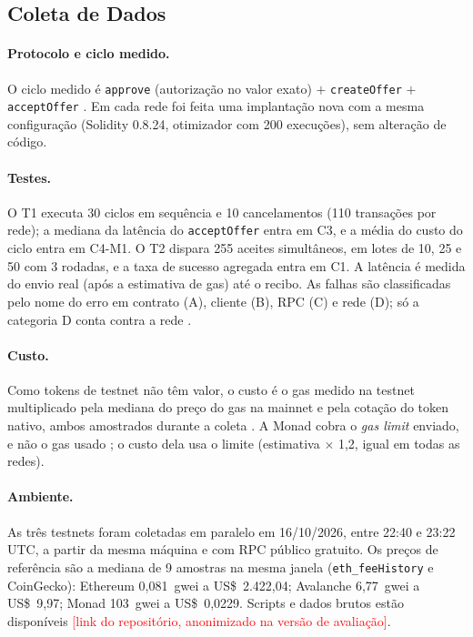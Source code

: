 \documentclass[10pt,a4paper]{article}
\newcommand{\pendente}[1]{\textcolor{red}{[#1]}}
\newcommand{\fn}[1]{\texttt{#1}}
\begin{document}
\subsection{Coleta de Dados}

\paragraph{Protocolo e ciclo medido.} O ciclo medido é \fn{approve} (autorização no valor exato) $+$ \fn{createOffer} $+$ \fn{acceptOffer} \cite{eip20}. Em cada rede foi feita uma implantação nova com a mesma configuração (Solidity 0.8.24, otimizador com 200 execuções), sem alteração de código.

\paragraph{Testes.} O T1 executa 30 ciclos em sequência e 10 cancelamentos (110 transações por rede); a mediana da latência do \fn{acceptOffer} entra em C3, e a média do custo do ciclo entra em C4-M1. O T2 dispara 255 aceites simultâneos, em lotes de 10, 25 e 50 com 3 rodadas, e a taxa de sucesso agregada entra em C1. A latência é medida do envio real (após a estimativa de gas) até o recibo. As falhas são classificadas pelo nome do erro em contrato (A), cliente (B), RPC (C) e rede (D); só a categoria D conta contra a rede \cite{hyperledger2018metrics,lazar2025}.

\paragraph{Custo.} Como tokens de testnet não têm valor, o custo é o gas medido na testnet multiplicado pela mediana do preço do gas na mainnet e pela cotação do token nativo, ambos amostrados durante a coleta \cite{ethereum2024gas}. A Monad cobra o \emph{gas limit} enviado, e não o gas usado \cite{monad2024gas}; o custo dela usa o limite (estimativa $\times$ 1,2, igual em todas as redes).

\paragraph{Ambiente.} As três testnets foram coletadas em paralelo em 16/10/2026, entre 22:40 e 23:22 UTC, a partir da mesma máquina e com RPC público gratuito. Os preços de referência são a mediana de 9 amostras na mesma janela (\fn{eth\_feeHistory} e CoinGecko): Ethereum 0,081~gwei a US\$~2.422,04; Avalanche 6,77~gwei a US\$~9,97; Monad 103~gwei a US\$~0,0229. Scripts e dados brutos estão disponíveis \pendente{link do repositório, anonimizado na versão de avaliação}.
\end{document}
